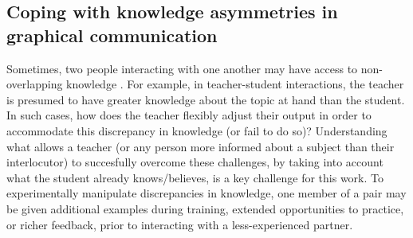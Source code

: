 \documentclass[12pt]{article}
\begin{document}


\subsection{Coping with knowledge asymmetries in graphical communication}

Sometimes, two people interacting with one another may have access to non-overlapping knowledge \cite{Wu:2007tz}. For example, in teacher-student interactions, the teacher is presumed to have greater knowledge about the topic at hand than the student. In such cases, how does the teacher flexibly adjust their output in order to accommodate this discrepancy in knowledge (or fail to do so)? Understanding what allows a teacher (or any person more informed about a subject than their interlocutor) to succesfully overcome these challenges, by taking into account what the student already knows/believes, is a key challenge for this work. To experimentally manipulate discrepancies in knowledge, one member of a pair may be given additional examples during training, extended opportunities to practice, or richer feedback, prior to interacting with a less-experienced partner. 


\setlength{\bibleftmargin}{.125in}
\setlength{\bibindent}{-\bibleftmargin}

\end{document}

